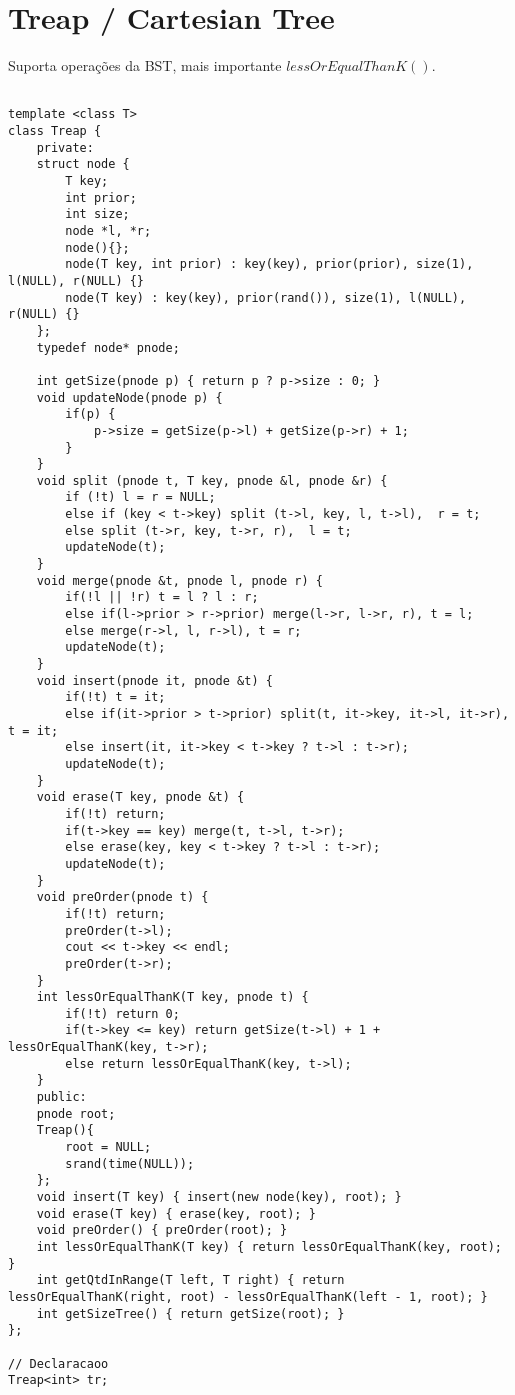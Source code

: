 \section{Treap / Cartesian Tree}

Suporta operações da BST, mais importante $lessOrEqualThanK()$.
\begin{multicols}{2}
	\begin{lstlisting}

template <class T>
class Treap {
	private:
	struct node {
		T key;
		int prior;
		int size;
		node *l, *r;
		node(){};
		node(T key, int prior) : key(key), prior(prior), size(1), l(NULL), r(NULL) {}
		node(T key) : key(key), prior(rand()), size(1), l(NULL), r(NULL) {}
	};
	typedef node* pnode;
	
	int getSize(pnode p) { return p ? p->size : 0; }
	void updateNode(pnode p) { 
		if(p) {
			p->size = getSize(p->l) + getSize(p->r) + 1; 
		}
	}
	void split (pnode t, T key, pnode &l, pnode &r) {
		if (!t) l = r = NULL;
		else if (key < t->key) split (t->l, key, l, t->l),  r = t;
		else split (t->r, key, t->r, r),  l = t;
		updateNode(t);
	}
	void merge(pnode &t, pnode l, pnode r) {
		if(!l || !r) t = l ? l : r;
		else if(l->prior > r->prior) merge(l->r, l->r, r), t = l;
		else merge(r->l, l, r->l), t = r;
		updateNode(t);
	}
	void insert(pnode it, pnode &t) {
		if(!t) t = it;
		else if(it->prior > t->prior) split(t, it->key, it->l, it->r), t = it;
		else insert(it, it->key < t->key ? t->l : t->r);
		updateNode(t);
	}
	void erase(T key, pnode &t) {
		if(!t) return;
		if(t->key == key) merge(t, t->l, t->r);
		else erase(key, key < t->key ? t->l : t->r);
		updateNode(t);
	}
	void preOrder(pnode t) {
		if(!t) return;
		preOrder(t->l);
		cout << t->key << endl;
		preOrder(t->r);
	}
	int lessOrEqualThanK(T key, pnode t) {
		if(!t) return 0;
		if(t->key <= key) return getSize(t->l) + 1 + lessOrEqualThanK(key, t->r);
		else return lessOrEqualThanK(key, t->l);
	}
	public:
	pnode root;
	Treap(){
		root = NULL; 
		srand(time(NULL));
	};
	void insert(T key) { insert(new node(key), root); }
	void erase(T key) { erase(key, root); }
	void preOrder() { preOrder(root); }
	int lessOrEqualThanK(T key) { return lessOrEqualThanK(key, root); }
	int getQtdInRange(T left, T right) { return lessOrEqualThanK(right, root) - lessOrEqualThanK(left - 1, root); }
	int getSizeTree() { return getSize(root); }
};

// Declaracaoo
Treap<int> tr;

\end{lstlisting}
\end{multicols}

